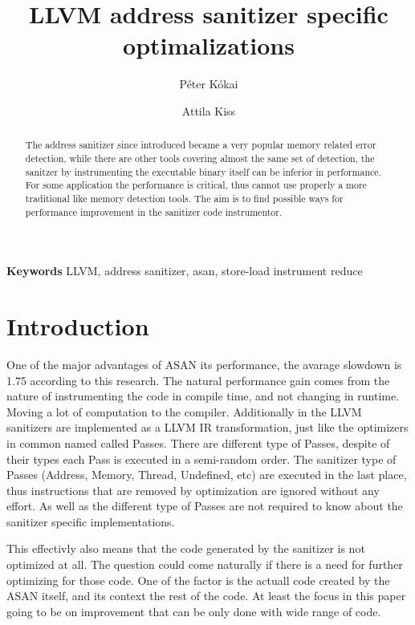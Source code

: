 \documentclass[letterpaper, 10 pt]{llncs}
\title{\LARGE \bf
LLVM address sanitizer specific optimalizations
}
\author{P\'eter K\'okai \and
        Attila Kiss}
\institute{Eotrovs Lorand University, \and
\email{kokaipeter@gmail.com, kiss@inf.elte.hu}
}
\let\cite\parencite
\begin{document}
\maketitle
\thispagestyle{empty}
\pagestyle{empty}


\begin{abstract}
The address sanitizer since introduced became a very popular memory related error detection, while there are other tools covering almost the same set of detection, the sanitzer by instrumenting the executable binary itself can be inferior in performance. For some application the performance is critical, thus cannot use properly a more traditional like memory detection tools.
The aim is to find possible ways for performance improvement in the sanitizer code instrumentor.


\end{abstract} \hspace{10pt}

\small \textbf{Keywords} LLVM, address sanitizer, asan, store-load instrument reduce



\section{Introduction}


One of the major advantages of ASAN its performance, the avarage slowdown is 1.75 according to this research\cite{serebryany2012addresssanitizer}. The natural performance gain comes from the nature of instrumenting the code in compile time, and not changing in runtime. Moving a lot of computation to the compiler. Additionally in the LLVM sanitizers are implemented as a LLVM IR\cite{llvm-ir} transformation, just like the optimizers in common named called Passes. There are different type of Passes, despite of their types each Pass is executed in a semi-random order. The sanitizer type of Passes (Address, Memory, Thread, Undefined, etc) are executed in the last place, thus instructions that are removed by optimization are ignored without any effort. As well as the different type of Passes are not required to know about the sanitizer specific implementations.

This effectivly also means that the code generated by the sanitizer is not optimized at all. The question could come naturally if there is a need for further optimizing for those code. One of the factor is the actuall code created by the ASAN itself, and its context the rest of the code. At least the focus in this paper going to be on improvement that can be only done with wide range of code.
\end{document}
